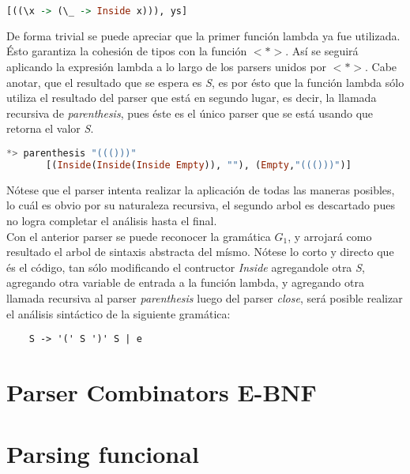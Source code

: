 \begin{exmp}
	\begin{lstlisting}[language=Haskell]
	[((\x -> (\_ -> Inside x))), ys]
	\end{lstlisting}
	
	De forma trivial se puede apreciar que la primer función lambda ya fue utilizada. Ésto garantiza la cohesión de tipos  con la función $<*>$. Así se seguirá aplicando la expresión lambda a lo largo de los parsers unidos por $<*>$. Cabe anotar, que el resultado que se espera es \emph{S}, es por ésto que la función lambda sólo utiliza el resultado del parser que está en segundo lugar, es decir, la llamada recursiva de \emph{parenthesis}, pues éste es el único parser que se está usando que retorna el valor \emph{S}.
	
	\begin{lstlisting}[language=Haskell, caption=Ejemplo de la utilización del parser en GHCi]
	*> parenthesis "((()))"
	   [(Inside(Inside(Inside Empty)), ""), (Empty,"((()))")]
	\end{lstlisting}
	
	Nótese que el parser intenta realizar la aplicación de todas las maneras posibles, lo cuál es obvio por su naturaleza recursiva, el segundo arbol es descartado pues no logra completar el análisis hasta el final.\\
	
	Con el anterior parser se puede reconocer la gramática $G_1$, y arrojará como resultado el arbol de sintaxis abstracta del mísmo. Nótese lo corto y directo que és el código, tan sólo modificando el contructor \emph{Inside} agregandole otra \emph{S}, agregando otra variable de entrada a la función lambda, y agregando otra llamada recursiva al parser \emph{parenthesis} luego del parser \emph{close}, será posible realizar el análisis sintáctico de la siguiente gramática:
	
	\begin{lstlisting}
	S -> '(' S ')' S | e
	\end{lstlisting}
	
\end{exmp}

\section{Parser Combinators E-BNF}
	
\section{Parsing funcional}




